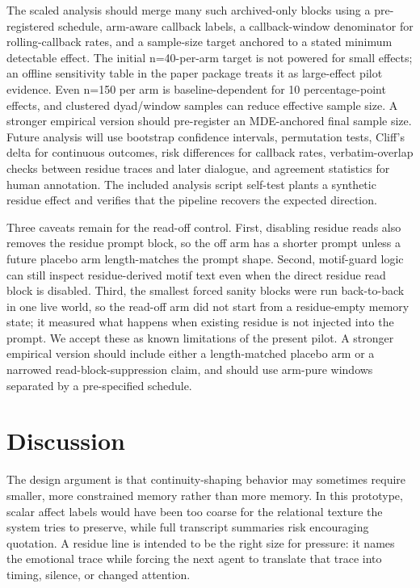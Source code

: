 \documentclass[11pt]{article}
\begin{document}
The scaled analysis should merge many such archived-only blocks using a pre-registered schedule, arm-aware callback labels, a callback-window denominator for rolling-callback rates, and a sample-size target anchored to a stated minimum detectable effect. The initial n=40-per-arm target is not powered for small effects; an offline sensitivity table in the paper package treats it as large-effect pilot evidence. Even n=150 per arm is baseline-dependent for 10 percentage-point effects, and clustered dyad/window samples can reduce effective sample size. A stronger empirical version should pre-register an MDE-anchored final sample size. Future analysis will use bootstrap confidence intervals, permutation tests, Cliff's delta for continuous outcomes, risk differences for callback rates, verbatim-overlap checks between residue traces and later dialogue, and agreement statistics for human annotation. The included analysis script self-test plants a synthetic residue effect and verifies that the pipeline recovers the expected direction.

Three caveats remain for the read-off control. First, disabling residue reads also removes the residue prompt block, so the off arm has a shorter prompt unless a future placebo arm length-matches the prompt shape. Second, motif-guard logic can still inspect residue-derived motif text even when the direct residue read block is disabled. Third, the smallest forced sanity blocks were run back-to-back in one live world, so the read-off arm did not start from a residue-empty memory state; it measured what happens when existing residue is not injected into the prompt. We accept these as known limitations of the present pilot. A stronger empirical version should include either a length-matched placebo arm or a narrowed read-block-suppression claim, and should use arm-pure windows separated by a pre-specified schedule.

\section{Discussion}

The design argument is that continuity-shaping behavior may sometimes require smaller, more constrained memory rather than more memory. In this prototype, scalar affect labels would have been too coarse for the relational texture the system tries to preserve, while full transcript summaries risk encouraging quotation. A residue line is intended to be the right size for pressure: it names the emotional trace while forcing the next agent to translate that trace into timing, silence, or changed attention.
\end{document}
